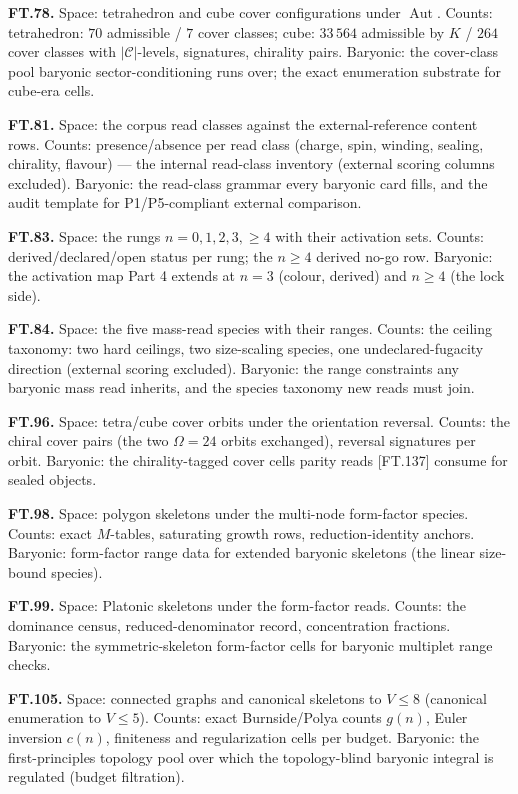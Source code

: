 \textbf{FT.78.} Space: tetrahedron and cube cover configurations under $\operatorname{Aut}$. Counts: tetrahedron: $70$ admissible / $7$ cover classes; cube: $33\,564$ admissible by $K$ / $264$ cover classes with $|\mathcal C|$-levels, signatures, chirality pairs. Baryonic: the cover-class pool baryonic sector-conditioning runs over; the exact enumeration substrate for cube-era cells.

\textbf{FT.81.} Space: the corpus read classes against the external-reference content rows. Counts: presence/absence per read class (charge, spin, winding, sealing, chirality, flavour) — the internal read-class inventory (external scoring columns excluded). Baryonic: the read-class grammar every baryonic card fills, and the audit template for P1/P5-compliant external comparison.

\textbf{FT.83.} Space: the rungs $n=0,1,2,3,\ge4$ with their activation sets. Counts: derived/declared/open status per rung; the $n\ge4$ derived no-go row. Baryonic: the activation map Part 4 extends at $n=3$ (colour, derived) and $n\ge4$ (the lock side).

\textbf{FT.84.} Space: the five mass-read species with their ranges. Counts: the ceiling taxonomy: two hard ceilings, two size-scaling species, one undeclared-fugacity direction (external scoring excluded). Baryonic: the range constraints any baryonic mass read inherits, and the species taxonomy new reads must join.

\textbf{FT.96.} Space: tetra/cube cover orbits under the orientation reversal. Counts: the chiral cover pairs (the two $\Omega=24$ orbits exchanged), reversal signatures per orbit. Baryonic: the chirality-tagged cover cells parity reads [FT.137] consume for sealed objects.

\textbf{FT.98.} Space: polygon skeletons under the multi-node form-factor species. Counts: exact $M$-tables, saturating growth rows, reduction-identity anchors. Baryonic: form-factor range data for extended baryonic skeletons (the linear size-bound species).

\textbf{FT.99.} Space: Platonic skeletons under the form-factor reads. Counts: the dominance census, reduced-denominator record, concentration fractions. Baryonic: the symmetric-skeleton form-factor cells for baryonic multiplet range checks.

\textbf{FT.105.} Space: connected graphs and canonical skeletons to $V\le8$ (canonical enumeration to $V\le5$). Counts: exact Burnside/Polya counts $g(n)$, Euler inversion $c(n)$, finiteness and regularization cells per budget. Baryonic: the first-principles topology pool over which the topology-blind baryonic integral is regulated (budget filtration).

